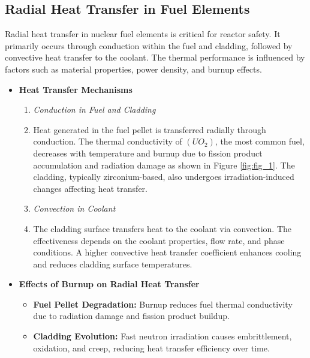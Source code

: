 \documentclass[12pt]{article}
\begin{document}
\begin{multicols}{2}
\section{Radial Heat Transfer in Fuel Elements}

Radial heat transfer in nuclear fuel elements is critical for reactor safety. It primarily occurs through conduction within the fuel and cladding, followed by convective heat transfer to the coolant. The thermal performance is influenced by factors such as material properties, power density, and burnup effects.

\begin{itemize}
    \item \textbf{Heat Transfer Mechanisms}
    \begin{enumerate}[itemindent=1cm]
        \item \textit{Conduction in Fuel and Cladding} 
        \item[] Heat generated in the fuel pellet is transferred radially through conduction. The thermal conductivity of $(UO_{2})$, the most common fuel, decreases with temperature and burnup due to fission product accumulation and radiation damage \cite{osti_1035151} as shown in Figure \ref{fig:fig_1}. The cladding, typically zirconium-based, also undergoes irradiation-induced changes affecting heat transfer.
        \item \textit{Convection in Coolant}
        \item[] The cladding surface transfers heat to the coolant via convection. The effectiveness depends on the coolant properties, flow rate, and phase conditions. A higher convective heat transfer coefficient enhances cooling and reduces cladding surface temperatures. 
    \end{enumerate}
    \item \textbf{Effects of Burnup on Radial Heat Transfer}
    \begin{itemize}
        \item \textbf{Fuel Pellet Degradation:} Burnup reduces fuel thermal conductivity due to radiation damage and fission product buildup.
        \item \textbf{Cladding Evolution:} Fast neutron irradiation causes embrittlement, oxidation, and creep, reducing heat transfer efficiency over time.
    \end{itemize}
\end{itemize}

\end{multicols}
\end{document}
